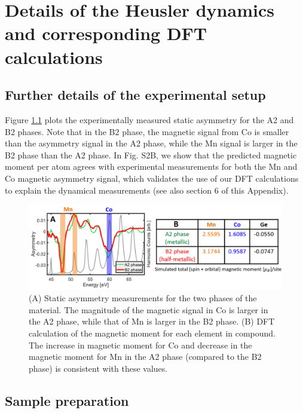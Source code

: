\chapter{Details of the Heusler dynamics and corresponding DFT calculations}	

\section{Further details of the experimental setup}

Figure \ref{fig: Heuslerstatic} plots the experimentally measured static asymmetry for the A2 and B2 phases. Note that in the B2 phase, the magnetic signal from Co is smaller than the asymmetry signal in the A2 phase, while the Mn signal is larger in the B2 phase than the A2 phase. In Fig. S2B, we show that the predicted magnetic moment per atom agrees with experimental measurements for both the Mn and Co magnetic asymmetry signal, which validates the use of our DFT calculations to explain the dynamical measurements (see also section 6 of this Appendix).

\begin{figure}[htbp]
	\begin{center}
		\includegraphics[width=150mm]{figs/Heuslerstatic}
	\end{center}
	\caption{(A) Static asymmetry measurements for the two phases of the material. The magnitude of the magnetic signal in Co is larger in the A2 phase, while that of Mn is larger in the B2 phase. (B) DFT calculation of the magnetic moment for each element in compound. The increase in magnetic moment for Co and decrease in the magnetic moment for Mn in the A2 phase (compared to the B2 phase) is consistent with these values.}
	\label{fig: Heuslerstatic}
\end{figure}

\section{Sample preparation}

